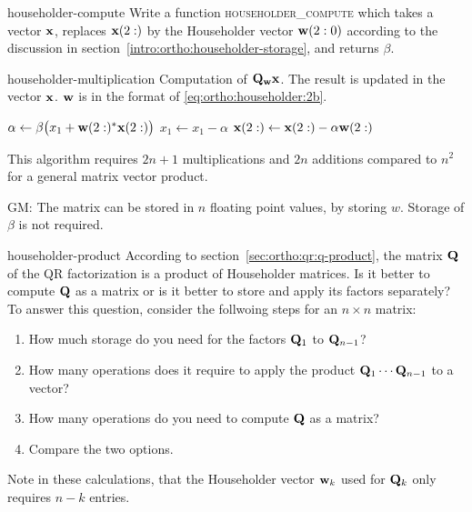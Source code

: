 \begin{Problem}{householder-compute}
  Write a function \textsc{householder\_compute} which takes a vector
  $\mathbf x$, replaces $\mathbf x(2:)$ by the Householder vector $\mathbf w(2:0)$
  according to the discussion in
  section~\ref{intro:ortho:householder-storage}, and returns $\beta$.
\end{Problem}

\begin{Algorithm}{householder-multiplication}
  Computation of $\mathbf Q_{\mathbf w}\mathbf x$. The result is updated in the vector
  $\mathbf x$. $\mathbf w$ is in the format of \eqref{eq:ortho:householder:2b}.

  \hrulefill
  \vspace*{2mm}
  \begin{algorithmic}[1]
    \State $\alpha \gets \beta \bigl( x_1 + \mathbf w(2:)^*\mathbf x(2:)\bigr)$
    \State $x_1 \gets x_1 - \alpha$
    \State $\mathbf x(2:) \gets \mathbf x(2:) - \alpha \mathbf w(2:)$
    \EndIf
    \EndFunction
  \end{algorithmic}
   \hrulefill

   This algorithm requires $2n+1$ multiplications and $2n$ additions
   compared to $n^2$ for a general matrix vector product.
\end{Algorithm}
\begin{todo}
  GM: The matrix can be stored in \(n\) floating point values, by storing \(w\). Storage of \(\beta\) is not required.
\end{todo}

\begin{Problem}{householder-product}
  According to section~\ref{sec:ortho:qr:q-product}, the matrix
  $\mathbf Q$ of the QR factorization is a product of Householder
  matrices. Is it better to compute $\mathbf Q$ as a matrix or is it
  better to store and apply its factors separately? To answer this
  question, consider the follwoing steps for an $n\times n$ matrix:
  \begin{enumerate}
  \item How much storage do you need for the factors $\mathbf Q_1$ to $\mathbf Q_{n-1}$?
  \item How many operations does it require to apply the product
    $\mathbf Q_1\cdots\mathbf Q_{n-1}$ to a vector?
  \item How many operations do you need to compute $\mathbf Q$ as a matrix?
  \item Compare the two options.
  \end{enumerate}
  Note in these calculations, that the Householder vector $\mathbf w_k$ used
  for $\mathbf Q_k$ only requires $n-k$ entries.
\end{Problem}

